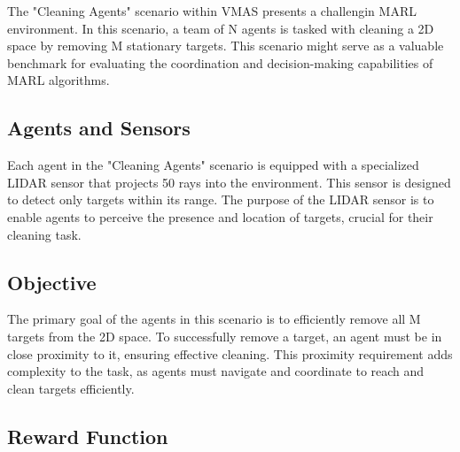\documentclass{scrartcl}
\begin{document}
The "Cleaning Agents" scenario within VMAS presents a challengin MARL environment. In this scenario, a team of N agents is tasked with cleaning a 2D space by removing M stationary targets. This scenario might serve as a valuable benchmark for evaluating the coordination and decision-making capabilities of MARL algorithms.

\subsection{Agents and Sensors}

Each agent in the "Cleaning Agents" scenario is equipped with a specialized LIDAR sensor that projects 50 rays into the environment. This sensor is designed to detect only targets within its range. The purpose of the LIDAR sensor is to enable agents to perceive the presence and location of targets, crucial for their cleaning task.

\subsection{Objective}

The primary goal of the agents in this scenario is to efficiently remove all M targets from the 2D space. To successfully remove a target, an agent must be in close proximity to it, ensuring effective cleaning. This proximity requirement adds complexity to the task, as agents must navigate and coordinate to reach and clean targets efficiently.

\subsection{Reward Function}
\end{document}
